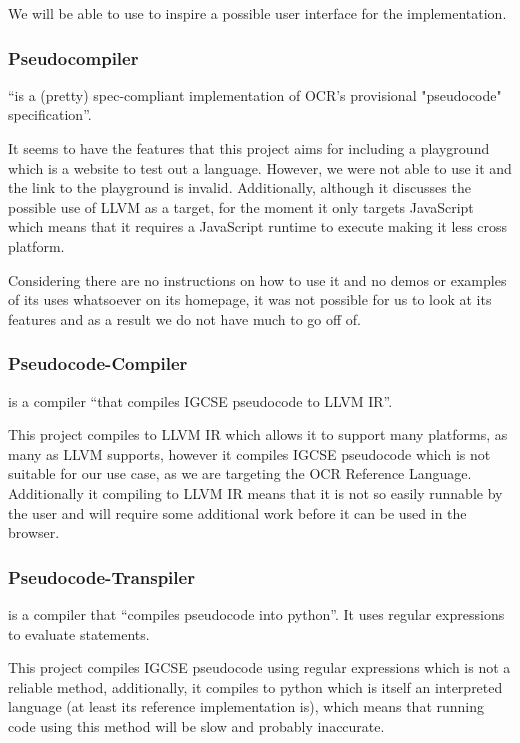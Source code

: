 \documentclass{article}
\begin{document}
We will be able to use  to inspire a possible user
interface for the implementation.

\subsubsection{Pseudocompiler}

 ``is a (pretty) spec-compliant implementation of
OCR's provisional "pseudocode" specification''.

It seems to have the features that this project aims for including a playground
which is a website to test out a language. However, we were not able to use it
and the link to the playground is invalid. Additionally, although it discusses
the possible use of LLVM as a target, for the moment it only targets JavaScript
which means that it requires a JavaScript runtime to execute making it less
cross platform.

Considering there are no instructions on how to use it and no demos or examples
of its uses whatsoever on its homepage, it was not possible for us to look at
its features and as a result we do not have much to go off of.

\subsubsection{Pseudocode-Compiler}

 is a compiler ``that compiles IGCSE pseudocode
to LLVM IR''.

This project compiles to LLVM IR which allows it to support many platforms, as
many as LLVM supports, however it compiles IGCSE pseudocode which is not
suitable for our use case, as we are targeting the OCR Reference Language.
Additionally it compiling to LLVM IR means that it is not so easily runnable by
the user and will require some additional work before it can be used in the
browser.

\subsubsection{Pseudocode-Transpiler}

 is a compiler that ``compiles pseudocode into
python''. It uses regular expressions to evaluate statements.

This project compiles IGCSE pseudocode using regular expressions which is not a
reliable method, additionally, it compiles to python which is itself an
interpreted language (at least its reference implementation is), which means
that running code using this method will be slow and probably inaccurate.
\end{document}
